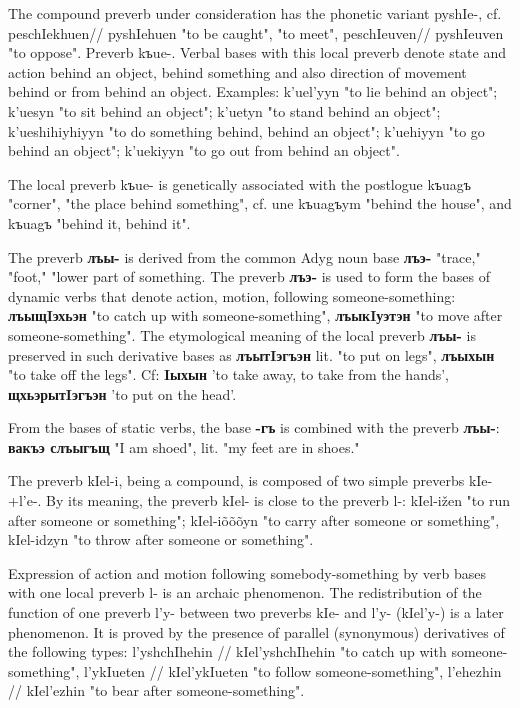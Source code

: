 \documentclass[a4paper,12pt]{book}
\newcommand{\1}[1]{\textbf{\emph{#1}}} %
\newcommand{\2}[1]{\textbf{[#1]}} %
\newcommand{\3}[1]{\fontsize{11pt}{0cm}\textbf{\emph{#1}}} %
\newcommand{\4}[1]{\fontsize{10pt}{0cm}\emph{#1}}	%
\newcommand{\5}[1]{\textbf{/#1/}} %
\newcommand{\6}[1]{\textbf{[#1]}} %
\newcommand{\7}[1]{\fontsize{12pt}{0cm}\emph{#1}} %
\newcommand{\8}[1]{\fontsize{12pt}{0cm}`#1'} %
\newcommand{\9}[1]{\fontsize{12pt}{0cm}(lit. `#1')} %
\begin{document}
The compound preverb under consideration has the phonetic variant pyshIe-, cf. peschIekhuen// pyshIehuen "to be caught", "to meet", peschIeuven// pyshIeuven "to oppose".
Preverb kъue-. Verbal bases with this local preverb denote state and action behind an object, behind something and also direction of movement behind or from behind an object. Examples: k'uel'yyn "to lie behind an object"; k'uesyn "to sit behind an object"; k'uetyn "to stand behind an object"; k'ueshihiyhiyyn "to do something behind, behind an object"; k'uehiyyn "to go behind an object"; k'uekiyyn "to go out from behind an object".

The local preverb kъue- is genetically associated with the postlogue kъuagъ "corner", "the place behind something", cf. une kъuagъym "behind the house", and kъuagъ "behind it, behind it".

The preverb \textbf{лъы-} is derived from the common Adyg noun base \textbf{лъэ-} "trace," "foot," "lower part of something. The preverb \textbf{лъэ-} is used to form the bases of dynamic verbs that denote action, motion, following someone-something: \textbf{лъыщIэхьэн} "to catch up with someone-something", \textbf{лъыкIуэтэн} "to move after someone-something".
The etymological meaning of the local preverb \textbf{лъы-} is preserved in such derivative bases as \textbf{лъытIэгъэн} lit. "to put on legs", \textbf{лъыхын} "to take off the legs". Cf: \textbf{Iыхын} 'to take away, to take from the hands', \textbf{щхьэрытIэгъэн} 'to put on the head'.

From the bases of static verbs, the base \textbf{-гъ} is combined with the preverb \textbf{лъы-}: \textbf{вакъэ слъыгъщ} "I am shoed", lit. "my feet are in shoes."

The preverb kIel-i, being a compound, is composed of two simple preverbs kIe-+l'e-. By its meaning, the preverb kIel- is close to the preverb l-: kIel-ižen "to run after someone or something"; kIel-iõõõyn "to carry after someone or something", kIel-idzyn "to throw after someone or something".

Expression of action and motion following somebody-something by verb bases with one local preverb l- is an archaic phenomenon. The redistribution of the function of one preverb l'y- between two preverbs kIe- and l'y- (kIel'y-) is a later phenomenon. It is proved by the presence of parallel (synonymous) derivatives of the following types: l'yshchIhehin // kIel'yshchIhehin "to catch up with someone-something", l'ykIueten // kIel'ykIueten "to follow someone-something", l'ehezhin // kIel'ezhin "to bear after someone-something".
\end{document}
